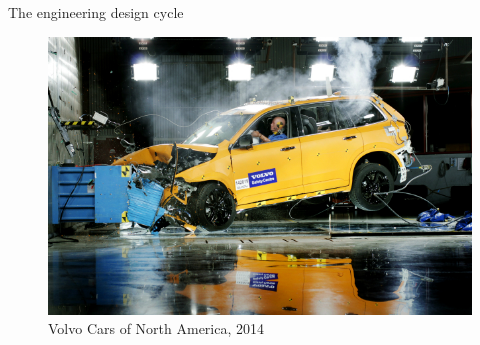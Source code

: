\documentclass[]{beamer}
\begin{document}
\begin{frame}{The engineering design cycle}
\begin{minipage}{0.55\linewidth}
        \begin{figure}
            \centering
            \includegraphics[width=0.99\linewidth]{intro/crash_test.jpg}
			\caption*{\tiny{Volvo Cars of North America, 2014}}
        \end{figure}
    \end{minipage}
\end{frame}
\end{document}
